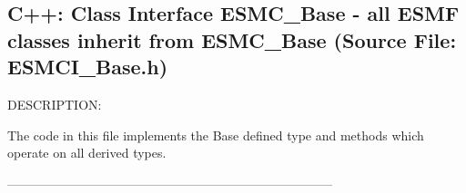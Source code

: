  
\setlength{\oldparskip}{\parskip}
\setlength{\parskip}{1.5ex}
\setlength{\oldparindent}{\parindent}
\setlength{\parindent}{0pt}
\setlength{\oldbaselineskip}{\baselineskip}
\setlength{\baselineskip}{11pt}
 
\def\bv{\begin{verbatim}}
\def\ev{\end{verbatim}}
\def\be{\begin{equation}}
\def\ee{\end{equation}}
\def\bea{\begin{eqnarray}}
\def\eea{\end{eqnarray}}
\def\bi{\begin{itemize}}
\def\ei{\end{itemize}}
\def\bn{\begin{enumerate}}
\def\en{\end{enumerate}}
\def\bd{\begin{description}}
\def\ed{\end{description}}
\def\({\left (}
\def\){\right )}
\def\[{\left [}
\def\]{\right ]}
\def\<{\left  \langle}
\def\>{\right \rangle}
\def\cI{{\cal I}}
\def\diag{\mathop{\rm diag}}
\def\tr{\mathop{\rm tr}}


 
\subsection{C++:  Class Interface ESMC\_Base - all ESMF classes inherit from ESMC\_Base (Source File: ESMCI\_Base.h)}


  
{\sf DESCRIPTION:\\ }


   The code in this file implements the Base defined type
   and methods which operate on all derived types.
  
  -----------------------------------------------------------------------------
  
